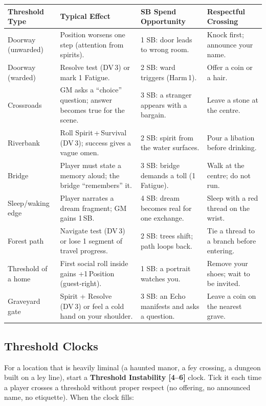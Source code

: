 \medskip
\begin{center}
\small
\renewcommand{\arraystretch}{1.2}
\begin{longtable}{p{2.8cm}p{3.2cm}p{2.8cm}p{3.2cm}}
\toprule
\textbf{Threshold Type} & \textbf{Typical Effect} & \textbf{SB Spend Opportunity} & \textbf{Respectful Crossing} \\
\midrule
Doorway (unwarded) & Position worsens one step (attention from spirits). & 1 SB: door leads to wrong room. & Knock first; announce your name. \\
Doorway (warded) & Resolve test (DV 3) or mark 1 Fatigue. & 2 SB: ward triggers (Harm 1). & Offer a coin or a hair. \\
Crossroads & GM asks a “choice” question; answer becomes true for the scene. & 3 SB: a stranger appears with a bargain. & Leave a stone at the centre. \\
Riverbank & Roll Spirit + Survival (DV 3); success gives a vague omen. & 2 SB: spirit from the water surfaces. & Pour a libation before drinking. \\
Bridge & Player must state a memory aloud; the bridge “remembers” it. & 3 SB: bridge demands a toll (1 Fatigue). & Walk at the centre; do not run. \\
Sleep/waking edge & Player narrates a dream fragment; GM gains 1 SB. & 4 SB: dream becomes real for one exchange. & Sleep with a red thread on the wrist. \\
Forest path & Navigate test (DV 3) or lose 1 segment of travel progress. & 2 SB: trees shift; path loops back. & Tie a thread to a branch before entering. \\
Threshold of a home & First social roll inside gains +1 Position (guest‑right). & 1 SB: a portrait watches you. & Remove your shoes; wait to be invited. \\
Graveyard gate & Spirit + Resolve (DV 3) or feel a cold hand on your shoulder. & 3 SB: an Echo manifests and asks a question. & Leave a coin on the nearest grave. \\
\bottomrule
\end{longtable}
\end{center}

\subsection*{Threshold Clocks}
For a location that is heavily liminal (a haunted manor, a fey crossing, a dungeon built on a ley line), start a \textbf{Threshold Instability [4–6]} clock. Tick it each time a player crosses a threshold without proper respect (no offering, no announced name, no etiquette). When the clock fills:

